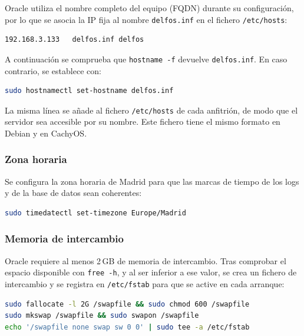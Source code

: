 Oracle utiliza el nombre completo del equipo (FQDN) durante su configuración, por lo que se asocia la IP fija al nombre \texttt{delfos.inf} en el fichero \texttt{/etc/hosts}:

\begin{lstlisting}
192.168.3.133   delfos.inf delfos
\end{lstlisting}

A continuación se comprueba que \texttt{hostname -f} devuelve \texttt{delfos.inf}. En caso contrario, se establece con:

\begin{lstlisting}[language=bash]
sudo hostnamectl set-hostname delfos.inf
\end{lstlisting}

La misma línea se añade al fichero \texttt{/etc/hosts} de cada anfitrión, de modo que el servidor sea accesible por su nombre. Este fichero tiene el mismo formato en Debian y en CachyOS.


\subsubsection{Zona horaria}

Se configura la zona horaria de Madrid para que las marcas de tiempo de los logs y de la base de datos sean coherentes:

\begin{lstlisting}[language=bash]
sudo timedatectl set-timezone Europe/Madrid
\end{lstlisting}

\subsubsection{Memoria de intercambio}

Oracle requiere al menos 2\,GB de memoria de intercambio. Tras comprobar el espacio disponible con \texttt{free -h}, y al ser inferior a ese valor, se crea un fichero de intercambio y se registra en \texttt{/etc/fstab} para que se active en cada arranque:

\begin{lstlisting}[language=bash]
sudo fallocate -l 2G /swapfile && sudo chmod 600 /swapfile
sudo mkswap /swapfile && sudo swapon /swapfile
echo '/swapfile none swap sw 0 0' | sudo tee -a /etc/fstab
\end{lstlisting}

